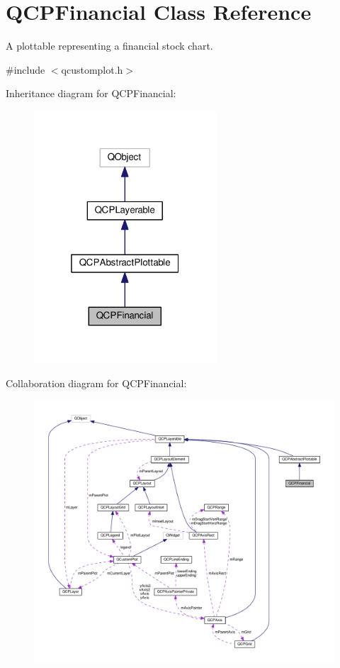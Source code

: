 \hypertarget{classQCPFinancial}{}\section{Q\+C\+P\+Financial Class Reference}
\label{classQCPFinancial}


A plottable representing a financial stock chart.  




{\ttfamily \#include $<$qcustomplot.\+h$>$}



Inheritance diagram for Q\+C\+P\+Financial\+:\nopagebreak
\begin{figure}[H]
\begin{center}
\leavevmode
\includegraphics[width=193pt]{classQCPFinancial__inherit__graph}
\end{center}
\end{figure}


Collaboration diagram for Q\+C\+P\+Financial\+:\nopagebreak
\begin{figure}[H]
\begin{center}
\leavevmode
\includegraphics[width=350pt]{classQCPFinancial__coll__graph}
\end{center}
\end{figure}
